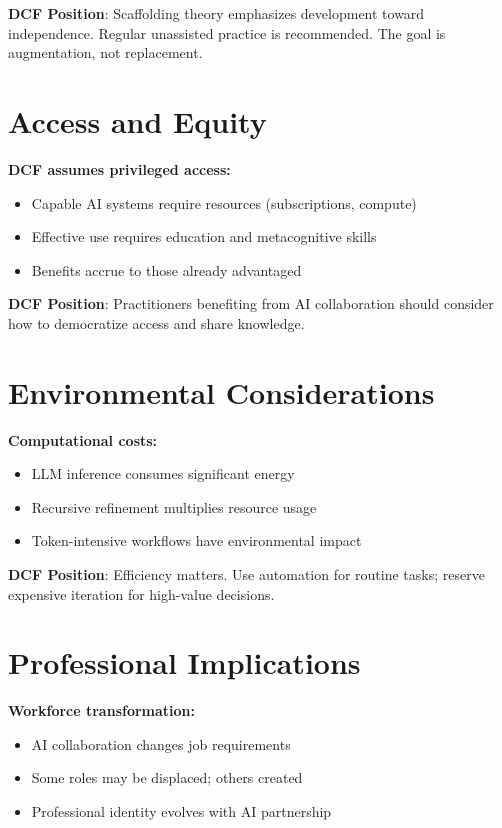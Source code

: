 \textbf{DCF Position}: Scaffolding theory emphasizes development toward independence. Regular unassisted practice is recommended. The goal is augmentation, not replacement.

\section{Access and Equity}

\textbf{DCF assumes privileged access:}
\begin{itemize}
    \item Capable AI systems require resources (subscriptions, compute)
    \item Effective use requires education and metacognitive skills
    \item Benefits accrue to those already advantaged
\end{itemize}

\textbf{DCF Position}: Practitioners benefiting from AI collaboration should consider how to democratize access and share knowledge.

\section{Environmental Considerations}

\textbf{Computational costs:}
\begin{itemize}
    \item LLM inference consumes significant energy
    \item Recursive refinement multiplies resource usage
    \item Token-intensive workflows have environmental impact
\end{itemize}

\textbf{DCF Position}: Efficiency matters. Use automation for routine tasks; reserve expensive iteration for high-value decisions.

\section{Professional Implications}

\textbf{Workforce transformation:}
\begin{itemize}
    \item AI collaboration changes job requirements
    \item Some roles may be displaced; others created
    \item Professional identity evolves with AI partnership
\end{itemize}

